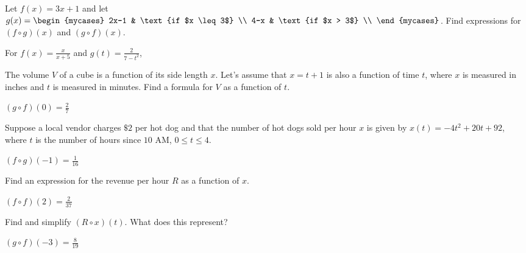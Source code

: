 \documentclass{ximera}
\begin{document}
\begin{question}
Let $f(x) = 3x+1$ and let $g(x) =    \begin{mycases}  2x-1 &  \text{if $x \leq 3$} \\   4-x & \text{if $x > 3$} \\  \end{mycases}$.  Find expressions for $(f \circ g)(x)$ and $(g \circ f)(x)$.

\begin{solution}
For  $f(x) = \frac{x}{x+5}$ and $g(t) = \frac{2}{7-t^2}$,



\end{solution}

\end{question}

\begin{question}
The volume $V$ of a cube is a function of its side length $x$.  Let's assume that $x = t + 1$ is also a function of time $t$, where $x$ is measured in inches and $t$ is measured in minutes.  Find a formula for $V$ as a function of $t$.
\begin{solution}
$(g\circ f)(0) = \frac{2}{7}$
\end{solution}

\end{question}

\begin{question}
Suppose a local vendor charges $\$2$ per hot dog and that the number of hot dogs sold per hour $x$ is given by $x(t) = -4t^2+20t+92$, where $t$ is the number of hours since $10$ AM, $0 \leq t \leq 4$.

\begin{solution}
$(f\circ g)(-1) = \frac{1}{16}$
\end{solution}

\end{question}

\begin{question}
Find an expression for the revenue per hour $R$ as a function of $x$.
\begin{solution}
$(f \circ f)(2) = \frac{2}{37}$

\end{solution}

\end{question}

\begin{question}
Find and simplify $\left(R \circ x\right)(t)$.  What does this represent?
\begin{solution}
$(g\circ f)(-3) = \frac{8}{19}$
\end{solution}

\end{question}
\end{document}
